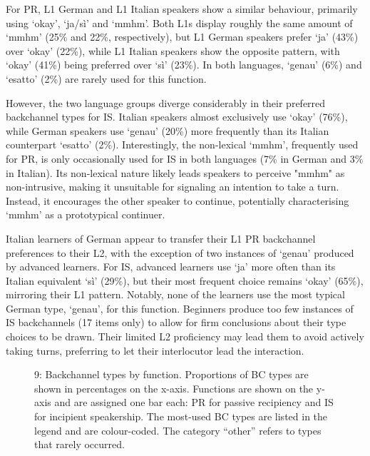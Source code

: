 For PR, L1 German and L1 Italian speakers show a similar behaviour, primarily using ‘okay’, ‘ja/sì’ and ‘mmhm’. Both L1s display roughly the same amount of ‘mmhm’ (25\% and 22\%, respectively), but L1 German speakers prefer ‘ja’ (43\%) over ‘okay’ (22\%), while L1 Italian speakers show the opposite pattern, with ‘okay’ (41\%) being preferred over ‘sì’ (23\%). In both languages, ‘genau’ (6\%) and ‘esatto’ (2\%) are rarely used for this function.

However, the two language groups diverge considerably in their preferred backchannel types for IS. Italian speakers almost exclusively use ‘okay’ (76\%), while German speakers use ‘genau’ (20\%) more frequently than its Italian counterpart ‘esatto’ (2\%). Interestingly, the non-lexical ‘mmhm’, frequently used for PR, is only occasionally used for IS in both languages (7\% in German and 3\% in Italian). Its non-lexical nature likely leads speakers to perceive "mmhm" as non-intrusive, making it unsuitable for signaling an intention to take a turn. Instead, it encourages the other speaker to continue, potentially characterising ‘mmhm’ as a prototypical continuer. 

Italian learners of German appear to transfer their L1 PR backchannel preferences to their L2, with the exception of two instances of ‘genau’ produced by advanced learners. For IS, advanced learners use ‘ja’ more often than its Italian equivalent ‘sì’ (29\%), but their most frequent choice remains ‘okay’ (65\%), mirroring their L1 pattern. Notably, none of the learners use the most typical German type, ‘genau’, for this function. Beginners produce too few instances of IS backchannels (17 items only) to allow for firm conclusions about their type choices to be drawn. Their limited L2 proficiency may lead them to avoid actively taking turns, preferring to let their interlocutor lead the interaction. 

  
 

\begin{stylecaption}\begin{figure}
\caption{9: Backchannel types by function. Proportions of BC types are shown in percentages on the x-axis. Functions are shown on the y-axis and are assigned one bar each: PR for passive recipiency and IS for incipient speakership. The most-used BC types are listed in the legend and are colour-coded. The category “other” refers to types that rarely occurred.}
\label{fig:key:13}
\end{figure}\end{stylecaption}

